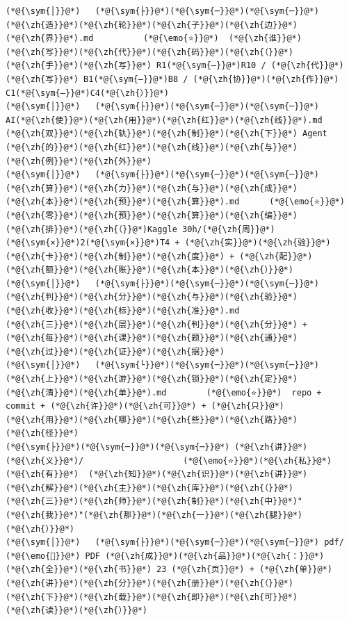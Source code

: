 \documentclass[
]{article}
\def\zh#1{{\zhfont #1}}
\def\sym#1{{\symfont #1}}
\def\emo#1{{\emofont #1}}
\begin{document}
\begin{lstlisting}
(*@{\sym{│}}@*)   (*@{\sym{├}}@*)(*@{\sym{─}}@*)(*@{\sym{─}}@*) (*@{\zh{造}}@*)(*@{\zh{轮}}@*)(*@{\zh{子}}@*)(*@{\zh{边}}@*)(*@{\zh{界}}@*).md          (*@{\emo{⭐}}@*)  (*@{\zh{谁}}@*)(*@{\zh{写}}@*)(*@{\zh{代}}@*)(*@{\zh{码}}@*)(*@{\zh{（}}@*)(*@{\zh{手}}@*)(*@{\zh{写}}@*) R1(*@{\sym{–}}@*)R10 / (*@{\zh{代}}@*)(*@{\zh{写}}@*) B1(*@{\sym{–}}@*)B8 / (*@{\zh{协}}@*)(*@{\zh{作}}@*) C1(*@{\sym{–}}@*)C4(*@{\zh{）}}@*)
(*@{\sym{│}}@*)   (*@{\sym{├}}@*)(*@{\sym{─}}@*)(*@{\sym{─}}@*) AI(*@{\zh{使}}@*)(*@{\zh{用}}@*)(*@{\zh{红}}@*)(*@{\zh{线}}@*).md              (*@{\zh{双}}@*)(*@{\zh{轨}}@*)(*@{\zh{制}}@*)(*@{\zh{下}}@*) Agent (*@{\zh{的}}@*)(*@{\zh{红}}@*)(*@{\zh{线}}@*)(*@{\zh{与}}@*)(*@{\zh{例}}@*)(*@{\zh{外}}@*)
(*@{\sym{│}}@*)   (*@{\sym{├}}@*)(*@{\sym{─}}@*)(*@{\sym{─}}@*) (*@{\zh{算}}@*)(*@{\zh{力}}@*)(*@{\zh{与}}@*)(*@{\zh{成}}@*)(*@{\zh{本}}@*)(*@{\zh{预}}@*)(*@{\zh{算}}@*).md      (*@{\emo{⭐}}@*)  (*@{\zh{零}}@*)(*@{\zh{预}}@*)(*@{\zh{算}}@*)(*@{\zh{编}}@*)(*@{\zh{排}}@*)(*@{\zh{（}}@*)Kaggle 30h/(*@{\zh{周}}@*) (*@{\sym{×}}@*)2(*@{\sym{×}}@*)T4 + (*@{\zh{实}}@*)(*@{\zh{验}}@*)(*@{\zh{卡}}@*)(*@{\zh{制}}@*)(*@{\zh{度}}@*) + (*@{\zh{配}}@*)(*@{\zh{额}}@*)(*@{\zh{账}}@*)(*@{\zh{本}}@*)(*@{\zh{）}}@*)
(*@{\sym{│}}@*)   (*@{\sym{├}}@*)(*@{\sym{─}}@*)(*@{\sym{─}}@*) (*@{\zh{判}}@*)(*@{\zh{分}}@*)(*@{\zh{与}}@*)(*@{\zh{验}}@*)(*@{\zh{收}}@*)(*@{\zh{标}}@*)(*@{\zh{准}}@*).md          (*@{\zh{三}}@*)(*@{\zh{层}}@*)(*@{\zh{判}}@*)(*@{\zh{分}}@*) + (*@{\zh{每}}@*)(*@{\zh{课}}@*)(*@{\zh{题}}@*)(*@{\zh{通}}@*)(*@{\zh{过}}@*)(*@{\zh{证}}@*)(*@{\zh{据}}@*)
(*@{\sym{│}}@*)   (*@{\sym{└}}@*)(*@{\sym{─}}@*)(*@{\sym{─}}@*) (*@{\zh{上}}@*)(*@{\zh{游}}@*)(*@{\zh{锁}}@*)(*@{\zh{定}}@*)(*@{\zh{清}}@*)(*@{\zh{单}}@*).md        (*@{\emo{⭐}}@*)  repo + commit + (*@{\zh{许}}@*)(*@{\zh{可}}@*) + (*@{\zh{只}}@*)(*@{\zh{用}}@*)(*@{\zh{哪}}@*)(*@{\zh{些}}@*)(*@{\zh{路}}@*)(*@{\zh{径}}@*)
(*@{\sym{├}}@*)(*@{\sym{─}}@*)(*@{\sym{─}}@*) (*@{\zh{讲}}@*)(*@{\zh{义}}@*)/                    (*@{\emo{⭐}}@*)(*@{\zh{私}}@*)(*@{\zh{有}}@*)  (*@{\zh{知}}@*)(*@{\zh{识}}@*)(*@{\zh{讲}}@*)(*@{\zh{解}}@*)(*@{\zh{主}}@*)(*@{\zh{库}}@*)(*@{\zh{（}}@*)(*@{\zh{三}}@*)(*@{\zh{师}}@*)(*@{\zh{制}}@*)(*@{\zh{中}}@*)"(*@{\zh{我}}@*)"(*@{\zh{那}}@*)(*@{\zh{一}}@*)(*@{\zh{腿}}@*)(*@{\zh{）}}@*)
(*@{\sym{│}}@*)   (*@{\sym{├}}@*)(*@{\sym{─}}@*)(*@{\sym{─}}@*) pdf/                       (*@{\emo{📕}}@*) PDF (*@{\zh{成}}@*)(*@{\zh{品}}@*)(*@{\zh{：}}@*)(*@{\zh{全}}@*)(*@{\zh{书}}@*) 23 (*@{\zh{页}}@*) + (*@{\zh{单}}@*)(*@{\zh{讲}}@*)(*@{\zh{分}}@*)(*@{\zh{册}}@*)(*@{\zh{（}}@*)(*@{\zh{下}}@*)(*@{\zh{载}}@*)(*@{\zh{即}}@*)(*@{\zh{可}}@*)(*@{\zh{读}}@*)(*@{\zh{）}}@*)

\end{lstlisting}
\end{document}
